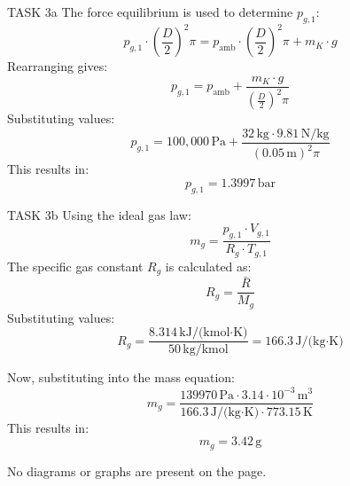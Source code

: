 TASK 3a  
The force equilibrium is used to determine \( p_{g,1} \):  
\[
p_{g,1} \cdot \left(\frac{D}{2}\right)^2 \pi = p_{\text{amb}} \cdot \left(\frac{D}{2}\right)^2 \pi + m_K \cdot g
\]  
Rearranging gives:  
\[
p_{g,1} = p_{\text{amb}} + \frac{m_K \cdot g}{\left(\frac{D}{2}\right)^2 \pi}
\]  
Substituting values:  
\[
p_{g,1} = 100{,}000 \, \text{Pa} + \frac{32 \, \text{kg} \cdot 9.81 \, \text{N/kg}}{\left(0.05 \, \text{m}\right)^2 \pi}
\]  
This results in:  
\[
p_{g,1} = 1.3997 \, \text{bar}
\]  

TASK 3b  
Using the ideal gas law:  
\[
m_g = \frac{p_{g,1} \cdot V_{g,1}}{R_g \cdot T_{g,1}}
\]  
The specific gas constant \( R_g \) is calculated as:  
\[
R_g = \frac{\bar{R}}{M_g}
\]  
Substituting values:  
\[
R_g = \frac{8.314 \, \text{kJ/(kmol·K)}}{50 \, \text{kg/kmol}} = 166.3 \, \text{J/(kg·K)}
\]  

Now, substituting into the mass equation:  
\[
m_g = \frac{139970 \, \text{Pa} \cdot 3.14 \cdot 10^{-3} \, \text{m}^3}{166.3 \, \text{J/(kg·K)} \cdot 773.15 \, \text{K}}
\]  
This results in:  
\[
m_g = 3.42 \, \text{g}
\]  

No diagrams or graphs are present on the page.